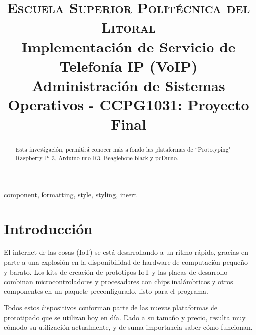 \documentclass[conference]{IEEEtran}
\begin{document}
\title{
{\large \textsc{Escuela Superior Politécnica del Litoral} \\}
Implementación de Servicio de
Telefonía IP (VoIP)\\
{\normalsize Administración de Sistemas Operativos - CCPG1031: Proyecto Final 
}}

\author{
\and
{}
\and
{}
}


\maketitle
\begin{abstract}
	Esta investigación, permitirá conocer más a fondo las plataformas de ``Prototyping" Raspberry Pi 3, Arduino uno R3, Beaglebone black y pcDuino.
\end{abstract}

\begin{IEEEkeywords}
	component, formatting, style, styling, insert
\end{IEEEkeywords}
\section{Introducción}\label{sec:int}
El internet de las cosas (IoT) se está desarrollando a un ritmo rápido, gracias en parte a una explosión en la disponibilidad de hardware de computación pequeño y barato. Los kits de creación de prototipos IoT y las placas de desarrollo combinan microcontroladores y procesadores con chips inalámbricos y otros componentes en un paquete preconfigurado, listo para el programa.

Todos estos dispositivos conforman parte de las nuevas plataformas de prototipado que se utilizan hoy en día. Dado a su tamaño y precio, resulta muy cómodo su utilización actualmente, y de suma importancia saber cómo funcionan.
\end{document}
